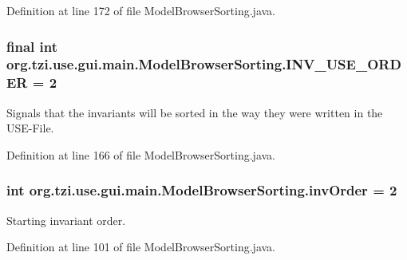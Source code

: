Definition at line 172 of file Model\-Browser\-Sorting.\-java.

\hypertarget{classorg_1_1tzi_1_1use_1_1gui_1_1main_1_1_model_browser_sorting_a99765a25f0528e7183ecf1e4dd6b4464}{
\subsubsection[{I\-N\-V\-\_\-\-U\-S\-E\-\_\-\-O\-R\-D\-E\-R}]{\setlength{\rightskip}{0pt plus 5cm}final int org.\-tzi.\-use.\-gui.\-main.\-Model\-Browser\-Sorting.\-I\-N\-V\-\_\-\-U\-S\-E\-\_\-\-O\-R\-D\-E\-R = 2\hspace{0.3cm}{\ttfamily [static]}}}\label{classorg_1_1tzi_1_1use_1_1gui_1_1main_1_1_model_browser_sorting_a99765a25f0528e7183ecf1e4dd6b4464}
Signals that the invariants will be sorted in the way they were written in the U\-S\-E-\/\-File. 

Definition at line 166 of file Model\-Browser\-Sorting.\-java.

\hypertarget{classorg_1_1tzi_1_1use_1_1gui_1_1main_1_1_model_browser_sorting_abc9e52c553b97504a612d008b4e85991}{
\subsubsection[{inv\-Order}]{\setlength{\rightskip}{0pt plus 5cm}int org.\-tzi.\-use.\-gui.\-main.\-Model\-Browser\-Sorting.\-inv\-Order = 2}}\label{classorg_1_1tzi_1_1use_1_1gui_1_1main_1_1_model_browser_sorting_abc9e52c553b97504a612d008b4e85991}
Starting invariant order. 

Definition at line 101 of file Model\-Browser\-Sorting.\-java.

